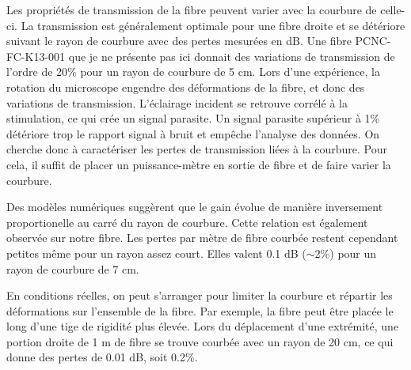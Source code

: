 Les propriétés de transmission de la fibre peuvent varier avec la courbure de celle-ci. La transmission est généralement optimale pour une fibre droite et se détériore suivant le rayon de courbure avec des pertes mesurées en dB. Une fibre PCNC-FC-K13-001 que je ne présente pas ici donnait des variations de transmission de l'ordre de 20\% pour un rayon de courbure de 5 cm.
Lors d'une expérience, la rotation du microscope engendre des déformations de la fibre, et donc des variations de transmission. L'éclairage incident se retrouve corrélé à la stimulation, ce qui crée un signal parasite. Un signal parasite supérieur à 1\% détériore trop le rapport signal à bruit et empêche l'analyse des données. On cherche donc à caractériser les pertes de transmission liées à la courbure. Pour cela, il suffit de placer un puissance-mètre en sortie de fibre et de faire varier la courbure.

Des modèles numériques \cite{setti_flexible_2013} \cite{yu_negative_2016} \cite{frosz_analytical_2017} suggèrent que le gain évolue de manière inversement proportionelle au carré du rayon de courbure. Cette relation est également observée sur notre fibre.
Les pertes par mètre de fibre courbée restent cependant petites même pour un rayon assez court. Elles valent 0.1 dB ($\sim$2\%) pour un rayon de courbure de 7 cm.

En conditions réelles, on peut s'arranger pour limiter la courbure et répartir les déformations sur l'ensemble de la fibre. Par exemple, la fibre peut être placée le long d'une tige de rigidité plus élevée. Lors du déplacement d'une extrémité, une portion droite de 1 m de fibre se trouve courbée avec un rayon de 20 cm, ce qui donne des pertes de 0.01 dB, soit 0.2\%.


